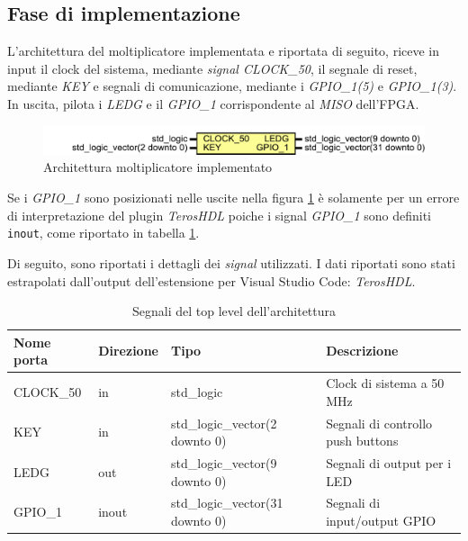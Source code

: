 \documentclass[titlepage]{report}
\begin{document}
		\subsection*{Fase di implementazione}
		\label{subsec:basic_mult_implementazione}
			L'architettura del moltiplicatore implementata e riportata di seguito, riceve in input il clock del sistema, mediante \textit{signal CLOCK\_50}, il segnale di reset, mediante \textit{KEY} e segnali di comunicazione, mediante i \textit{GPIO\_1(5)} e \textit{GPIO\_1(3)}. In uscita, pilota i \textit{LEDG} e il \textit{GPIO\_1} corrispondente al \textit{MISO} dell'FPGA.

			\begin{figure}[H]
				\centering
				\includegraphics[scale=0.6]{./img/basic_mult_module_teros.pdf}
				\caption{Architettura moltiplicatore implementato}
				\label{fig:basic_mult_module_teros}
			\end{figure}

			Se i \textit{GPIO\_1} sono posizionati nelle uscite nella figura \ref{fig:basic_mult_module_teros} è solamente per un errore di interpretazione del plugin \textit{TerosHDL} poiche i signal \textit{GPIO\_1} sono definiti \texttt{inout}, come riportato in tabella \ref{tab:signal_arch_basic_mult}.

			Di seguito, sono riportati i dettagli dei \textit{signal} utilizzati. I dati riportati sono stati estrapolati dall'output dell'estensione per Visual Studio Code: \textit{TerosHDL}.

			\begin{table}[H]
			\centering
			\begin{tabular}{|p{}|p{}|p{}|p{}|}
				\hline
				\textbf{Nome porta} & \textbf{Direzione} & \textbf{Tipo} & \textbf{Descrizione} \\
				\hline
				CLOCK\_50 & in & std\_logic & Clock di sistema a 50 MHz \\
				KEY & in & std\_logic\_vector(2 downto 0) & Segnali di controllo push buttons \\
				LEDG & out & std\_logic\_vector(9 downto 0) & Segnali di output per i LED \\
				GPIO\_1 & inout & std\_logic\_vector(31 downto 0) & Segnali di input/output GPIO \\
				\hline
			\end{tabular}
			\caption{Segnali del top level dell'architettura}
			\label{tab:signal_arch_basic_mult}
		\end{table}
\end{document}
